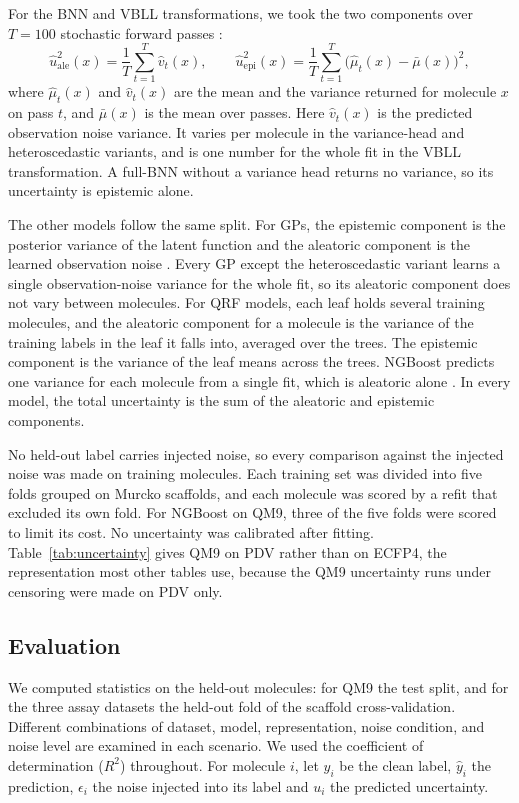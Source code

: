 For the BNN and VBLL transformations, we took the two components over $T = 100$ stochastic forward
passes \citep{kendall2017}:
\begin{equation}
\hat{u}^2_{\text{ale}}(x) = \frac{1}{T}\sum_{t=1}^{T}\hat{v}_t(x),
\qquad
\hat{u}^2_{\text{epi}}(x) = \frac{1}{T}\sum_{t=1}^{T}\big(\hat{\mu}_t(x) - \bar{\mu}(x)\big)^2 ,
\label{eq:sampling_split}
\end{equation}
where $\hat{\mu}_t(x)$ and $\hat{v}_t(x)$ are the mean and the variance returned for molecule $x$ on
pass $t$, and $\bar{\mu}(x)$ is the mean over passes. Here $\hat{v}_t(x)$ is the predicted observation
noise variance. It varies per molecule in the variance-head and heteroscedastic variants, and is one
number for the whole fit in the VBLL transformation. A full-BNN without a variance head returns no
variance, so its uncertainty is epistemic alone.

The other models follow the same split. For GPs, the epistemic component is the posterior variance of the latent function and the aleatoric component is the learned observation noise \citep{Rasmussen2005}. Every GP except the heteroscedastic variant learns a single observation-noise variance for the whole fit, so its aleatoric component does not vary between molecules. For QRF models, each leaf holds several training molecules, and the aleatoric component for a molecule is the variance of the training labels in the leaf it falls into, averaged over the trees. The epistemic component is the variance of the leaf means across the trees. NGBoost predicts one variance for each molecule from a single fit, which is aleatoric alone \citep{Duan2020}. In every model, the total uncertainty is the sum of the aleatoric and epistemic components.

No held-out label carries injected noise, so every comparison against the injected noise was made on
training molecules. Each training set was divided into five folds grouped on Murcko scaffolds, and each
molecule was scored by a refit that excluded its own fold. For NGBoost on QM9, three of the five folds
were scored to limit its cost. No uncertainty was calibrated after fitting. Table~\ref{tab:uncertainty} gives QM9 on PDV rather than on ECFP4, the representation most other tables use, because the QM9 uncertainty runs under censoring were made on PDV only.


\subsection{Evaluation}
We computed statistics on the held-out molecules: for QM9 the test split, and for the three assay datasets the held-out fold of the scaffold cross-validation. Different combinations of dataset, model, representation, noise condition, and noise level are examined in each scenario. We used the coefficient of determination ($R^2$) throughout. For molecule $i$, let $y_i$ be the clean label, $\hat{y}_i$ the prediction, $\epsilon_i$ the noise injected into its label and $u_i$ the predicted uncertainty.

